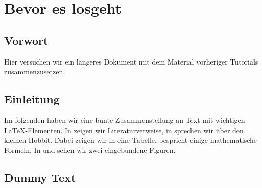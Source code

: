 \chapter{Bevor es losgeht}
%
\section{Vorwort}
Hier versuchen wir ein längeres Dokument mit dem Material vorheriger
Tutorials zusammenzusetzen.
%
\section{Einleitung}
Im folgenden haben wir eine bunte Zusammenstellung an Text mit
wichtigen \LaTeX{}-Elementen. In  zeigen wir
Literaturverweise, in  sprechen wir über den
kleinen Hobbit. Dabei zeigen wir in
 eine Tabelle. 
bespricht einige mathematische Formeln. In 
und  sehen wir zwei eingebundene Figuren.
%
\section{Dummy Text}
\blindtext
\blindtext
%
